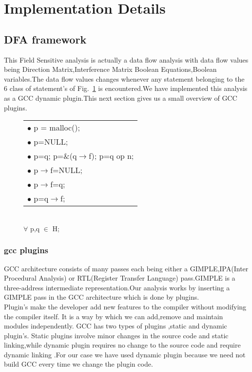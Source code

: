 
\section{Implementation Details}

\subsection{DFA framework}
      
    This Field Sensitive analysis is actually a data flow analysis with data flow values being Direction Matrix,Interference Matrix
Boolean Equations,Boolean variables.The data flow values changes whenever any statement belonging to
the 6 class of statement's of Fig.~\ref{fig:stmts} is encountered.We have implemented this analysis
as a GCC dynamic plugin.This next section gives us a small overview of GCC plugins.\\
 
\begin{figure}[h] 
\begin{tabular}[b]{l}
        $\bullet$  p = malloc(); \\
        $\bullet$  p=NULL; \\
        $\bullet$  p=q; p=\&(q$\rightarrow$f); p=q op n; \\
        $\bullet$  p$\rightarrow$f=NULL; \\
        $\bullet$  p$\rightarrow$f=q; \\
        $\bullet$  p=q$\rightarrow$f; \\
\end{tabular}
\\
$\forall$ p,q $\in$ H;

\caption{\label{fig:stmts}}
\end{figure}


  \subsubsection[]{gcc plugins}
      GCC architecture consists of many passes each being either a GIMPLE,IPA(Inter Procedural Analysis) or RTL(Register 
Transfer Language) pass.GIMPLE is a three-address intermediate representation.Our analysis works by inserting a
GIMPLE pass in the GCC architecture which is done by plugins. \\	  
      Plugin's make the developer add new features to the compiler without modifying the compiler itself.
It is a way by which we can add,remove and maintain modules independently.
GCC has two types of plugins ,static and dynamic plugin's. 
Static plugins involve minor changes in the source code and static linking,while dynamic plugin requires
no change to the source code and require dynamic linking \cite{plugin} .For our case we have used dynamic plugin 
because we need not build GCC every time we change the plugin code.

